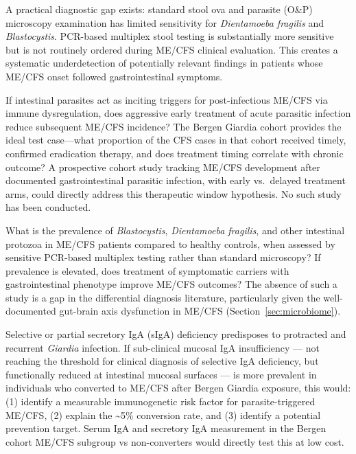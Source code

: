 A practical diagnostic gap exists: standard stool ova and parasite (O\&P) microscopy examination has limited sensitivity for \emph{Dientamoeba fragilis} and \emph{Blastocystis}. PCR-based multiplex stool testing is substantially more sensitive but is not routinely ordered during ME/CFS clinical evaluation. This creates a systematic underdetection of potentially relevant findings in patients whose ME/CFS onset followed gastrointestinal symptoms.

\begin{open_question}
\label{oq:parasite-prevention}
If intestinal parasites act as inciting triggers for post-infectious ME/CFS via immune dysregulation, does aggressive early treatment of acute parasitic infection reduce subsequent ME/CFS incidence? The Bergen Giardia cohort provides the ideal test case---what proportion of the CFS cases in that cohort received timely, confirmed eradication therapy, and does treatment timing correlate with chronic outcome? A prospective cohort study tracking ME/CFS development after documented gastrointestinal parasitic infection, with early vs.\ delayed treatment arms, could directly address this therapeutic window hypothesis. No such study has been conducted.
\end{open_question}

\begin{open_question}
\label{oq:parasite-screening}
What is the prevalence of \emph{Blastocystis}, \emph{Dientamoeba fragilis}, and other intestinal protozoa in ME/CFS patients compared to healthy controls, when assessed by sensitive PCR-based multiplex testing rather than standard microscopy? If prevalence is elevated, does treatment of symptomatic carriers with gastrointestinal phenotype improve ME/CFS outcomes? The absence of such a study is a gap in the differential diagnosis literature, particularly given the well-documented gut-brain axis dysfunction in ME/CFS (Section~\ref{sec:microbiome}).
\end{open_question}

\begin{open_question}
\label{oq:siga-parasite-mecfs}
Selective or partial secretory IgA (sIgA) deficiency predisposes to protracted and recurrent \emph{Giardia} infection. If sub-clinical mucosal IgA insufficiency --- not reaching the threshold for clinical diagnosis of selective IgA deficiency, but functionally reduced at intestinal mucosal surfaces --- is more prevalent in individuals who converted to ME/CFS after Bergen Giardia exposure, this would: (1) identify a measurable immunogenetic risk factor for parasite-triggered ME/CFS, (2) explain the \textasciitilde5\% conversion rate, and (3) identify a potential prevention target. Serum IgA and secretory IgA measurement in the Bergen cohort ME/CFS subgroup vs non-converters would directly test this at low cost.
\end{open_question}

